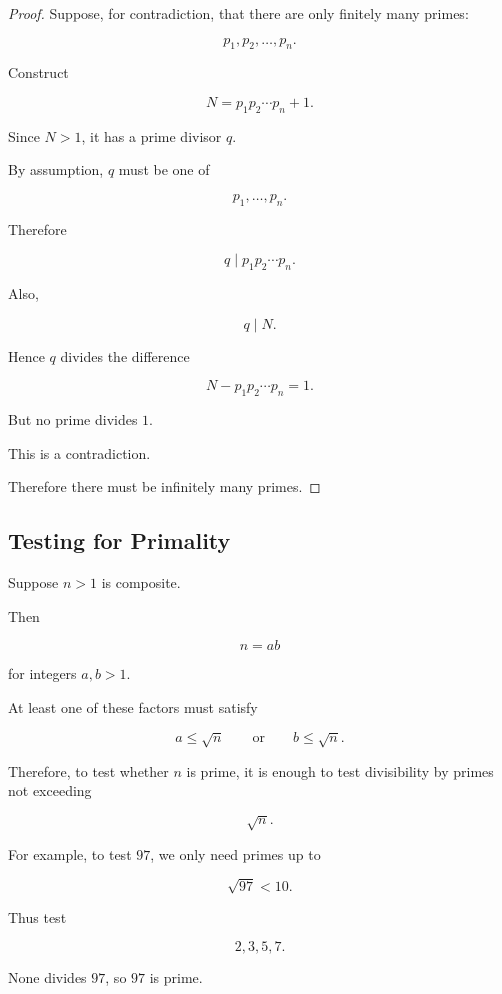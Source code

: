 \begin{proof}
Suppose, for contradiction, that there are only finitely many primes:

\[ p_1,p_2,\ldots,p_n. \]

Construct

\[ N=p_1p_2\cdots p_n+1. \]

Since \(N>1\), it has a prime divisor \(q\).

By assumption, \(q\) must be one of

\[ p_1,\ldots,p_n. \]

Therefore

\[ q\mid p_1p_2\cdots p_n. \]

Also,

\[ q\mid N. \]

Hence \(q\) divides the difference

\[ N-p_1p_2\cdots p_n=1. \]

But no prime divides \(1\).

This is a contradiction.

Therefore there must be infinitely many primes.
\end{proof}

\subsection{Testing for Primality}
\label{subsec:elementary-primality-testing}

Suppose \(n>1\) is composite.

Then

\[ n=ab \]

for integers \(a,b>1\).

At least one of these factors must satisfy

\[ a\leq\sqrt n \qquad\text{or}\qquad b\leq\sqrt n. \]

Therefore, to test whether \(n\) is prime, it is enough to test divisibility
by primes not exceeding

\[ \sqrt n. \]

For example, to test \(97\), we only need primes up to

\[ \sqrt{97}<10. \]

Thus test

\[ 2,3,5,7. \]

None divides \(97\), so \(97\) is prime.

